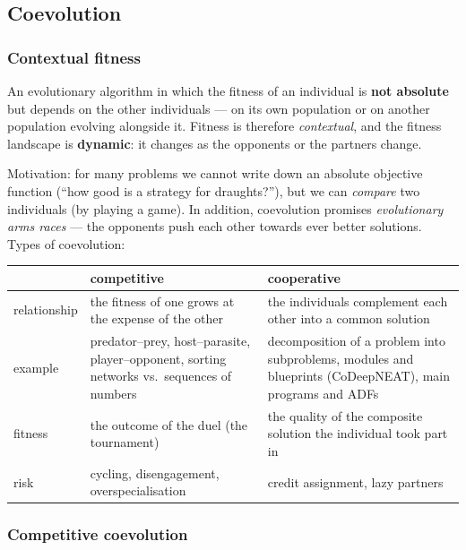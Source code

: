 \documentclass[11pt,a4paper]{article}
\theoremstyle{definition}
\providecommand{\uv}[1]{``#1''}
\begin{document}
\subsection{Coevolution}
\label{sec:koevoluce}
\subsubsection{Contextual fitness}

\begin{defbox}[Coevolution]
An evolutionary algorithm in which the fitness of an individual is \textbf{not
absolute} but depends on the other individuals --- on its own population or on
another population evolving alongside it. Fitness is therefore
\emph{contextual}, and the fitness landscape is \textbf{dynamic}: it changes as
the opponents or the partners change.
\end{defbox}

Motivation: for many problems we cannot write down an absolute objective
function (\uv{how good is a strategy for draughts?}), but we can \emph{compare}
two individuals (by playing a game). In addition, coevolution promises
\emph{evolutionary arms races} --- the opponents push each other towards ever
better solutions. Types of coevolution:

\begin{center}
\begin{tabular}{@{}p{3cm}p{6cm}p{6cm}@{}}
\toprule
 & \textbf{competitive} & \textbf{cooperative} \\
\midrule
relationship & the fitness of one grows at the expense of the other &
  the individuals complement each other into a common solution \\
example & predator--prey, host--parasite, player--opponent, sorting networks
  vs.\ sequences of numbers & decomposition of a problem into subproblems,
  modules and blueprints (CoDeepNEAT), main programs and ADFs \\
fitness & the outcome of the duel (the tournament) & the quality of the
  composite solution the individual took part in \\
risk & cycling, disengagement, overspecialisation & credit assignment, lazy
  partners \\
\bottomrule
\end{tabular}
\end{center}

\subsubsection{Competitive coevolution}
\end{document}
